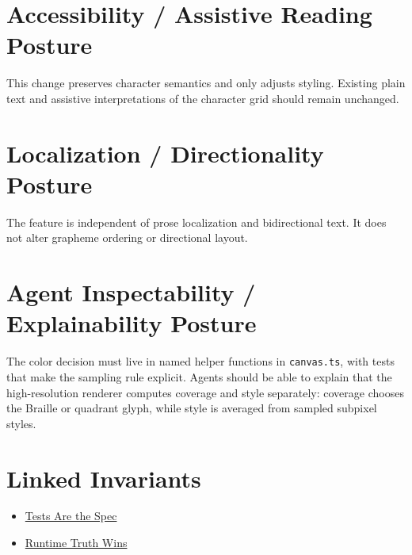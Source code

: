 \section{Accessibility / Assistive Reading Posture}\label{record-158-accessibility-assistive-reading-posture}

This change preserves character semantics and only adjusts styling. Existing plain text and assistive interpretations of the character grid should remain unchanged.

\section{Localization / Directionality Posture}\label{record-158-localization-directionality-posture}

The feature is independent of prose localization and bidirectional text. It does not alter grapheme ordering or directional layout.

\section{Agent Inspectability / Explainability Posture}\label{record-158-agent-inspectability-explainability-posture}

The color decision must live in named helper functions in \texttt{c\allowbreak{}a\allowbreak{}n\allowbreak{}v\allowbreak{}a\allowbreak{}s\allowbreak{}.\allowbreak{}t\allowbreak{}s}, with tests that make the sampling rule explicit. Agents should be able to explain that the high-resolution renderer computes coverage and style separately: coverage chooses the Braille or quadrant glyph, while style is averaged from sampled subpixel styles.

\section{Linked Invariants}\label{record-158-linked-invariants}

\begin{itemize}
\tightlist
\item
  \href{https://github.com/flyingrobots/bijou/blob/cbd70612140e7a450d764b3c7be1c6af878b99bc/docs/invariants/tests-are-the-spec.md}{Tests Are the Spec}
\item
  \href{https://github.com/flyingrobots/bijou/blob/cbd70612140e7a450d764b3c7be1c6af878b99bc/docs/invariants/runtime-truth-wins.md}{Runtime Truth Wins}
\end{itemize}

